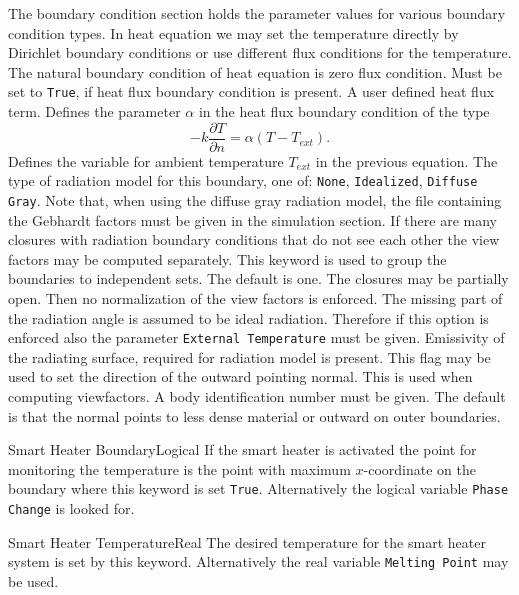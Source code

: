 The boundary condition section holds the parameter values for various
boundary condition types. In heat equation we may set the temperature directly 
by Dirichlet boundary conditions or use different flux conditions for the temperature.
The natural boundary condition of heat equation is zero flux condition.
\sifbegin
{}
Must be set to {\tt True},  if heat flux boundary
condition is present.
 A user defined heat flux term.
Defines the parameter $\alpha$ in the heat flux boundary
condition of the type
$$
    -k\frac{\partial T}{\partial n} = \alpha(T-T_{ext}) .
$$
Defines the variable for ambient temperature $T_{ext}$ in the previous equation.
The type of radiation model for this boundary,
one of: {\tt None}, {\tt Idealized}, {\tt Diffuse Gray}. 
Note that, when using the diffuse gray radiation model, the file containing
the Gebhardt factors must be given in the simulation section.
If there are many closures with radiation boundary conditions that do not
see each other the view factors may be computed separately. This keyword
is used to group the boundaries to independent sets. The default is one.
The closures may be partially open. Then no normalization of the view factors
is enforced. The missing part of the radiation angle is assumed to be 
ideal radiation. Therefore if this option is enforced also 
the parameter \texttt{External Temperature} must be given. 
Emissivity of the radiating surface, required for radiation model is present.
This flag may be used to set the
direction of the outward pointing normal. This is used when computing viewfactors.
A body identification number must be given.  The default is that the normal points to less
dense material or outward on outer boundaries.
%
\item{Smart Heater Boundary}{Logical}
If the smart heater is activated the point for monitoring the temperature is 
the point with maximum $x$-coordinate on the boundary where this 
keyword is set \texttt{True}. Alternatively the logical variable \texttt{Phase Change}
is looked for. 
\item{Smart Heater Temperature}{Real}
The desired temperature for the smart heater system is set by this keyword. 
Alternatively the real variable \texttt{Melting Point} may be used. 
\sifend
\sifend


